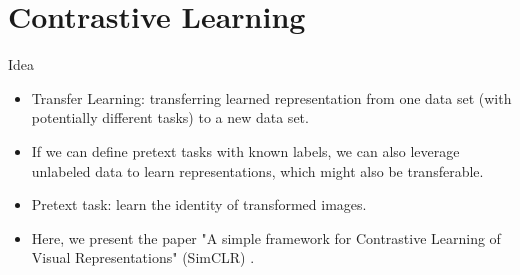 \documentclass[xcolor=pdftex,dvipsnames,table]{beamer}
\begin{document}
\section{Contrastive Learning}

\begin{frame}{Idea}
\begin{itemize}
\item Transfer Learning: transferring learned representation from one data set (with potentially different tasks) to a new data set. 
\item If we can define pretext tasks with known labels, we can also leverage unlabeled data to learn representations, which might also be transferable. 
\item Pretext task: learn the identity of transformed images. 
\item Here, we present the paper "A simple framework for Contrastive Learning of Visual Representations" (SimCLR) \cite{Chen2020}. 
\end{itemize}
\end{frame}
\end{document}
